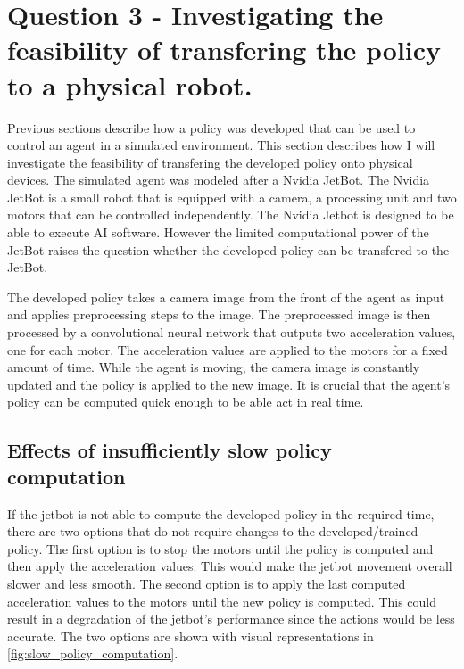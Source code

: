 \section{Question 3 - Investigating the feasibility of transfering the policy to a physical robot.}

Previous sections describe how a policy was developed that can be used to control an agent in a simulated environment. This section describes how I will investigate the feasibility of transfering the developed policy onto physical devices. The simulated agent was modeled after a Nvidia JetBot. The Nvidia JetBot is a small robot that is equipped with a camera, a processing unit and two motors that can be controlled independently. 
The Nvidia Jetbot is designed to be able to execute AI software. However the limited computational power of the JetBot raises the question whether the developed policy can be transfered to the JetBot. 

The developed policy takes a camera image from the front of the agent as input and applies preprocessing steps to the image. The preprocessed image is then processed by a convolutional neural network that outputs two acceleration values, one for each motor. The acceleration values are applied to the motors for a fixed amount of time. While the agent is moving, the camera image is constantly updated and the policy is applied to the new image. It is crucial that the agent's policy can be computed quick enough to be able act in real time. 

\subsection*{Effects of insufficiently slow policy computation}
If the jetbot is not able to compute the developed policy in the required time, there are two options that do not require changes to the developed/trained policy. The first option is to stop the motors until the policy is computed and then apply the acceleration values. This would make the jetbot movement overall slower and less smooth.
The second option is to apply the last computed acceleration values to the motors until the new policy is computed. This could result in a degradation of the jetbot's performance since the actions would be less accurate.
The two options are shown with visual representations in \ref{fig:slow_policy_computation}.




\newcommand{\spc}[2]{\subfigure[#1]{\texttt{[image: Bilder/slow\_policy\_computation/\#2.png]}}}

